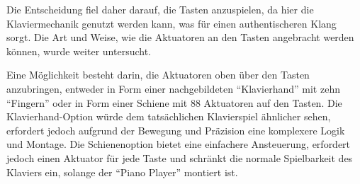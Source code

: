 Die Entscheidung fiel daher darauf, die Tasten anzuspielen, da hier die Klaviermechanik genutzt werden kann, was für einen
authentischeren Klang sorgt. Die Art und Weise, wie die Aktuatoren an den Tasten angebracht werden können, wurde
weiter untersucht.

Eine Möglichkeit besteht darin, die Aktuatoren oben über den Tasten anzubringen, entweder in Form einer nachgebildeten
\enquote{Klavierhand} mit zehn \enquote{Fingern} oder in Form einer Schiene mit 88 Aktuatoren auf den Tasten. Die Klavierhand-Option würde
dem tatsächlichen Klavierspiel ähnlicher sehen, erfordert jedoch aufgrund der Bewegung und Präzision eine komplexere Logik und
Montage. Die Schienenoption bietet eine einfachere Ansteuerung, erfordert jedoch einen Aktuator für jede Taste und schränkt die
normale Spielbarkeit des Klaviers ein, solange der \enquote{Piano Player} montiert ist.

